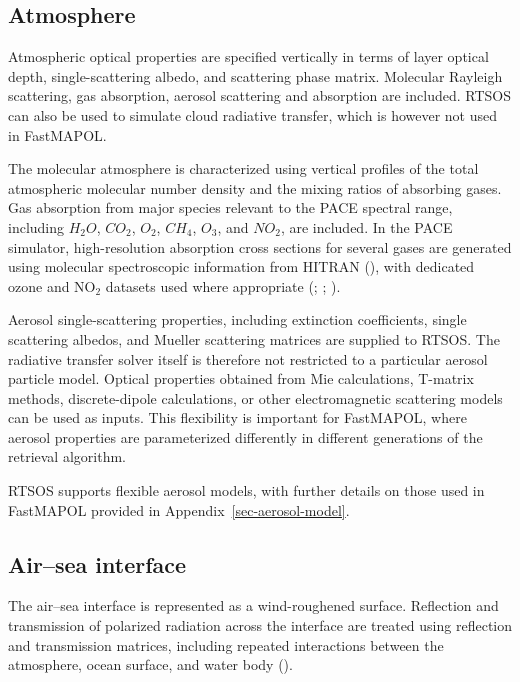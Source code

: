 \documentclass[
  11pt,
  letterpaper,
]{scrreprt}
\begin{document}
\subsection{Atmosphere}\label{atmosphere}

Atmospheric optical properties are specified vertically in terms of
layer optical depth, single-scattering albedo, and scattering phase
matrix. Molecular Rayleigh scattering, gas absorption, aerosol
scattering and absorption are included. RTSOS can also be used to
simulate cloud radiative transfer, which is however not used in
FastMAPOL.

The molecular atmosphere is characterized using vertical profiles of the
total atmospheric molecular number density and the mixing ratios of
absorbing gases. Gas absorption from major species relevant to the PACE
spectral range, including \(H_2O\), \(CO_2\), \(O_2\), \(CH_4\),
\(O_3\), and \(NO_2\), are included. In the PACE simulator,
high-resolution absorption cross sections for several gases are
generated using molecular spectroscopic information from HITRAN
(), with dedicated ozone
and NO\(_2\) datasets used where appropriate
(;
;
).

Aerosol single-scattering properties, including extinction coefficients,
single scattering albedos, and Mueller scattering matrices are supplied
to RTSOS. The radiative transfer solver itself is therefore not
restricted to a particular aerosol particle model. Optical properties
obtained from Mie calculations, T-matrix methods, discrete-dipole
calculations, or other electromagnetic scattering models can be used as
inputs. This flexibility is important for FastMAPOL, where aerosol
properties are parameterized differently in different generations of the
retrieval algorithm.

RTSOS supports flexible aerosol models, with further details on those
used in FastMAPOL provided in Appendix~\ref{sec-aerosol-model}.

\subsection{Air--sea interface}\label{airsea-interface}

The air--sea interface is represented as a wind-roughened surface.
Reflection and transmission of polarized radiation across the interface
are treated using reflection and transmission matrices, including
repeated interactions between the atmosphere, ocean surface, and water
body ().
\end{document}
